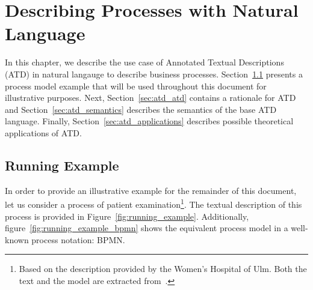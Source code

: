 \chapter{Describing Processes with Natural Language}
\label{cha:atd}

In this chapter, we describe the use case of Annotated Textual
Descriptions (ATD) in natural langauge to describe business processes.
Section~\ref{sec:atd_running_example} presents a process model example that will be
used throughout this document for illustrative purposes. Next,
Section~\ref{sec:atd_atd} contains a rationale for ATD and 
Section~\ref{sec:atd_semantics} describes the semantics of the base ATD
language. Finally, Section~\ref{sec:atd_applications} describes possible
theoretical applications of ATD.

\section{Running Example}
\label{sec:atd_running_example}

In order to provide an illustrative example for the remainder of this document,
let us consider a process of patient examination\footnote{Based on the
  description provided by the Women's Hospital of Ulm. Both the text and the
  model are extracted from~\cite{CabanillasKRRMC15}.}.  The textual description
of this process is provided in Figure~\ref{fig:running_example}. Additionally,
figure~\ref{fig:running_example_bpmn} shows the equivalent process model in a
well-known process notation: BPMN.

